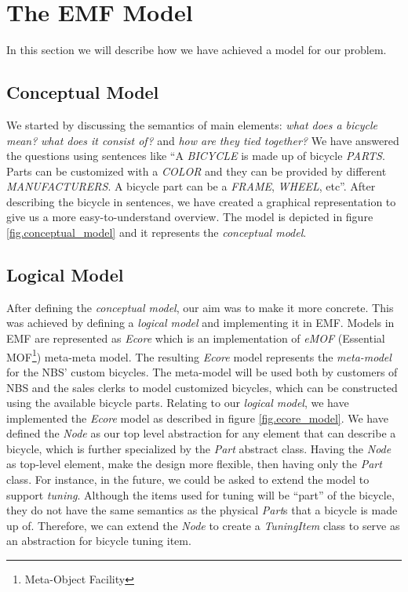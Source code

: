 \section{The EMF Model}
\label{sec.logical_model}
In this section we will describe how we have achieved a model for our problem.

\subsection{Conceptual Model}
\noindent We started by discussing the semantics of main elements: \emph{what
does a bicycle mean?} \emph{what does it consist of?} and \emph{how are they
tied together?} We have answered the questions using sentences like ``A
\emph{BICYCLE} is made up of bicycle \emph{PARTS}. Parts can be customized with
a \emph{COLOR} and they can be provided by different \emph{MANUFACTURERS}.
A bicycle part can be a \emph{FRAME}, \emph{WHEEL}, etc''. After describing the
bicycle in sentences, we have created a graphical representation to give us a
more easy-to-understand overview. The model is depicted in figure
\ref{fig.conceptual_model} and it represents the \emph{conceptual model}.

\subsection{Logical Model}
\noindent After defining the \emph{conceptual model}, our aim was to make it
more concrete. This was achieved by defining a \emph{logical model} and
implementing it in EMF. Models in EMF are represented as \emph{Ecore} which is 
an implementation of \emph{eMOF} (Essential MOF\footnote{Meta-Object Facility}) meta-meta model. The resulting \emph{Ecore} model represents the \emph{meta-model} for
the NBS' custom bicycles. The meta-model will be used both by customers of NBS and the sales
clerks to model customized bicycles, which can be constructed using the
available bicycle parts. Relating to our \emph{logical model}, we have
implemented the \emph{Ecore} model as described in figure \ref{fig.ecore_model}.
We have defined the \emph{Node} as our top level abstraction for any element
that can describe a bicycle, which is further specialized by the \emph{Part}
abstract class. Having the \emph{Node} as top-level element, make the design
more flexible, then having only the \emph{Part} class. For instance,  in the
future, we could be asked to extend the model to support \emph{tuning}. Although
the items used for tuning will be ``part'' of the bicycle, they do not have the
same semantics as the physical \emph{Part}s that a bicycle is made up of.
Therefore, we can extend the \emph{Node} to create a \emph{TuningItem} class to
serve as an abstraction for bicycle tuning item.\\


